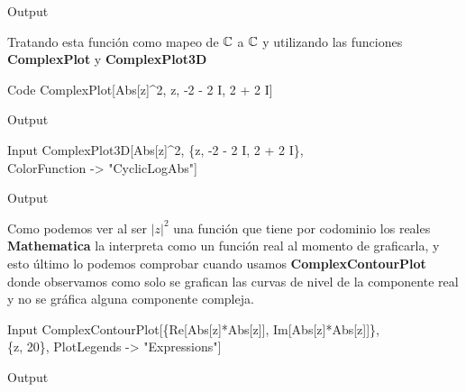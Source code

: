 \begin{mmaCell}[moregraphics={moreig={scale=.4}}]{Output}
\end{mmaCell}

Tratando esta función como mapeo de $\mathbb{C}$ a $\mathbb{C}$ y utilizando las funciones \textbf{ComplexPlot} y \textbf{ComplexPlot3D}

\begin{mmaCell}[functionlocal=y]{Code}
	 ComplexPlot[Abs[z]^2, {z, -2 - 2 I, 2 + 2 I}]
\end{mmaCell}

\begin{mmaCell}[moregraphics={moreig={scale=.35}}]{Output}
\end{mmaCell}

\begin{mmaCell}{Input}
  ComplexPlot3D[Abs[z]^2, \{z, -2 - 2 I, 2 + 2 I\},\\ColorFunction -> "CyclicLogAbs"]
\end{mmaCell}

\begin{mmaCell}[moregraphics={moreig={scale=.4}}]{Output}
\end{mmaCell}
Como podemos ver al ser $|z|^2$ una función que tiene por codominio los reales \textbf{Mathematica} la interpreta como un función real al momento de graficarla, y esto último lo podemos comprobar cuando usamos \textbf{ComplexContourPlot} donde observamos como solo se grafican las curvas de nivel de la componente real y no se gráfica alguna componente compleja.
\begin{mmaCell}{Input}
	 ComplexContourPlot[\{Re[Abs[z]*Abs[z]], Im[Abs[z]*Abs[z]]\},\\\{z, 20\}, PlotLegends -> "Expressions"]
\end{mmaCell}

\begin{mmaCell}[moregraphics={moreig={scale=.35}}]{Output}
\end{mmaCell}


